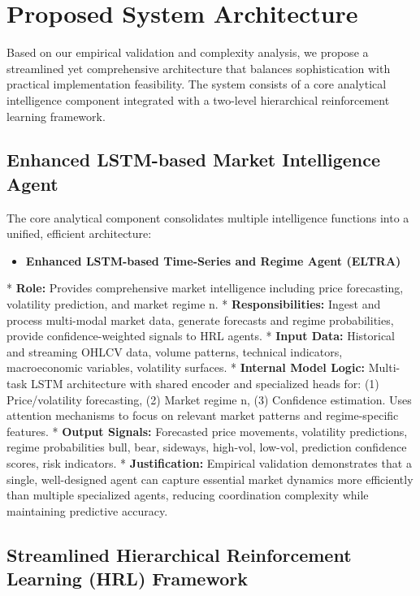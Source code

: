\documentclass[11pt]{article}
\begin{document}
\section{Proposed System Architecture}

Based on our empirical validation and complexity analysis, we propose a streamlined yet comprehensive architecture that balances sophistication with practical implementation feasibility. The system consists of a core analytical intelligence component integrated with a two-level hierarchical reinforcement learning framework.

\subsection{Enhanced LSTM-based Market Intelligence Agent}

The core analytical component consolidates multiple intelligence functions into a unified, efficient architecture:

\begin{itemize}
\item   \textbf{Enhanced LSTM-based Time-Series and Regime Agent (ELTRA)}
\end{itemize}
    *   \textbf{Role:} Provides comprehensive market intelligence including price forecasting, volatility prediction, and market regime n.
    *   \textbf{Responsibilities:} Ingest and process multi-modal market data, generate forecasts and regime probabilities, provide confidence-weighted signals to HRL agents.
    *   \textbf{Input Data:} Historical and streaming OHLCV data, volume patterns, technical indicators, macroeconomic variables, volatility surfaces.
    *   \textbf{Internal Model Logic:} Multi-task LSTM architecture with shared encoder and specialized heads for: (1) Price/volatility forecasting, (2) Market regime n, (3) Confidence estimation. Uses attention mechanisms to focus on relevant market patterns and regime-specific features.
    *   \textbf{Output Signals:} Forecasted price movements, volatility predictions, regime probabilities {bull, bear, sideways, high-vol, low-vol}, prediction confidence scores, risk indicators.
    *   \textbf{Justification:} Empirical validation demonstrates that a single, well-designed agent can capture essential market dynamics more efficiently than multiple specialized agents, reducing coordination complexity while maintaining predictive accuracy.

\subsection{Streamlined Hierarchical Reinforcement Learning (HRL) Framework}
\end{document}
